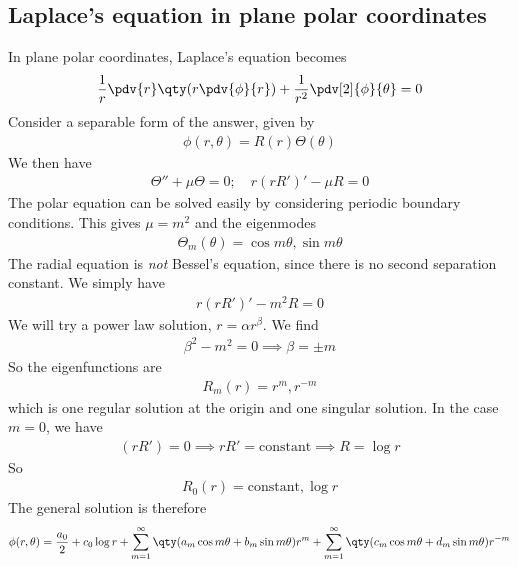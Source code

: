 \subsection{Laplace's equation in plane polar coordinates}
In plane polar coordinates, Laplace's equation becomes
\begin{align*}
	\frac{1}{r} \pdv{r} \qty(r \pdv{\phi}{r}) + \frac{1}{r^2} \pdv[2]{\phi}{\theta} = 0
\end{align*}
Consider a separable form of the answer, given by
\begin{align*}
	\phi(r,\theta) = R(r) \Theta(\theta)
\end{align*}
We then have
\begin{align*}
	\Theta'' + \mu \Theta = 0;\quad r(rR')' - \mu R = 0
\end{align*}
The polar equation can be solved easily by considering periodic boundary conditions.
This gives $\mu = m^2$ and the eigenmodes
\begin{align*}
	\Theta_m(\theta) = \cos m \theta, \sin m \theta
\end{align*}
The radial equation is \textit{not} Bessel's equation, since there is no second separation constant.
We simply have
\begin{align*}
	r(rR')' - m^2 R = 0
\end{align*}
We will try a power law solution, $r = \alpha r^\beta$.
We find
\begin{align*}
	\beta^2 - m^2 = 0 \implies \beta = \pm m
\end{align*}
So the eigenfunctions are
\begin{align*}
	R_m(r) = r^m, r^{-m}
\end{align*}
which is one regular solution at the origin and one singular solution.
In the case $m = 0$, we have
\begin{align*}
	(rR') = 0 \implies rR' = \text{constant} \implies R = \log r
\end{align*}
So
\begin{align*}
	R_0(r) = \text{constant}, \log r
\end{align*}
The general solution is therefore
\begin{align*}
	\phi(r,\theta) = \frac{a_0}{2} + c_0 \log r + \sum_{m=1}^\infty \qty(a_m \cos m\theta + b_m \sin m\theta) r^m + \sum_{m=1}^\infty \qty(c_m \cos m\theta + d_m \sin m\theta) r^{-m}
\end{align*}
